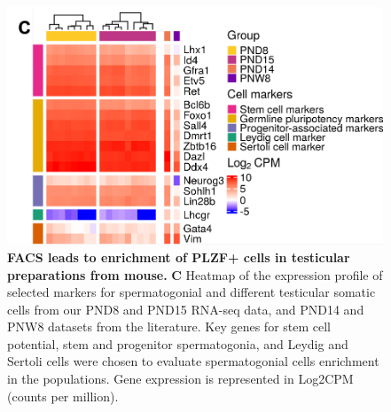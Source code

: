 \documentclass[12pt,twoside]{reedthesis}
\begin{document}
\begin{subfigures}
\begin{figure}[H]

{\centering \includegraphics{thesis_files/figure-latex/ds1b-1} 

}

\caption[FACS leads to enrichment of PLZF+ cells in testicular preparations from mouse]{\textbf{FACS leads to enrichment of PLZF+ cells in testicular preparations from mouse.} \newline \textbf{C} Heatmap of the expression profile of selected markers for spermatogonial and different testicular somatic cells from our PND8 and PND15  RNA-seq data, and PND14 and PNW8 datasets from the literature. Key genes for stem cell potential, stem and progenitor spermatogonia, and Leydig and Sertoli cells were chosen to evaluate spermatogonial cells enrichment in the populations. Gene expression is represented in Log2CPM (counts per million).}\label{fig:ds1b}
\end{figure}
\end{subfigures}
\end{document}
